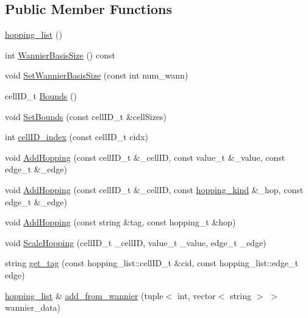 \subsection*{Public Member Functions}
\begin{DoxyCompactItemize}
\item 
\hyperlink{classhopping__list_afaed7dcbb41d5574b29a1bdf10302539}{hopping\+\_\+list} ()
\item 
int \hyperlink{classhopping__list_ae128c276220b0da9b2fcd92632ade569}{Wannier\+Basis\+Size} () const 
\item 
void \hyperlink{classhopping__list_a1b279de0f9c4bc23483245007bb43dd0}{Set\+Wannier\+Basis\+Size} (const int num\+\_\+wann)
\item 
cell\+I\+D\+\_\+t \hyperlink{classhopping__list_afaac6d4d4ff81f11856b62a05b0cf7a2}{Bounds} ()
\item 
void \hyperlink{classhopping__list_abb88b998a8960ca5a9a1c9a83dc316e6}{Set\+Bounds} (const cell\+I\+D\+\_\+t \&cell\+Sizes)
\item 
int \hyperlink{classhopping__list_a1d2ed0ea1881423174565d48fdd8eb7e}{cell\+I\+D\+\_\+index} (const cell\+I\+D\+\_\+t cidx)
\item 
void \hyperlink{classhopping__list_ac6306e64f621457e02eebe91597da8ba}{Add\+Hopping} (const cell\+I\+D\+\_\+t \&\+\_\+cell\+ID, const value\+\_\+t \&\+\_\+value, const edge\+\_\+t \&\+\_\+edge)
\item 
void \hyperlink{classhopping__list_a6f368e8d15bfe657eb4878837be01941}{Add\+Hopping} (const cell\+I\+D\+\_\+t \&\+\_\+cell\+ID, const \hyperlink{classhopping__kind}{hopping\+\_\+kind} \&\+\_\+hop, const edge\+\_\+t \&\+\_\+edge)
\item 
void \hyperlink{classhopping__list_a6eab8d8939b7c5343688831cb842bb92}{Add\+Hopping} (const string \&tag, const hopping\+\_\+t \&hop)
\item 
void \hyperlink{classhopping__list_ac23a0793888fd149e156d15d984bb0ce}{Scale\+Hopping} (cell\+I\+D\+\_\+t \+\_\+cell\+ID, value\+\_\+t \+\_\+value, edge\+\_\+t \+\_\+edge)
\item 
string \hyperlink{classhopping__list_a975de806f3712c94cf28687951a5d0c2}{get\+\_\+tag} (const hopping\+\_\+list\+::cell\+I\+D\+\_\+t \&cid, const hopping\+\_\+list\+::edge\+\_\+t edge)
\item 
\hyperlink{classhopping__list}{hopping\+\_\+list} \& \hyperlink{classhopping__list_a34db85b21f0ef09211e3d453982bf00b}{add\+\_\+from\+\_\+wannier} (tuple$<$ int, vector$<$ string $>$ $>$ wannier\+\_\+data)
\item 

\end{DoxyCompactItemize}
